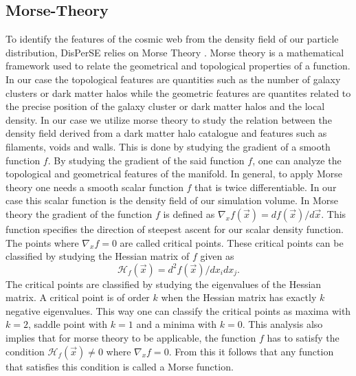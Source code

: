 \subsection{Morse-Theory}
To identify the features of the cosmic web from the density field of our
particle distribution, DisPerSE relies on Morse Theory \cite{Morse}. Morse
theory is a mathematical framework used to relate the geometrical and
topological properties of a function. In our case the topological features are quantities such as the number of galaxy clusters or dark matter halos while the geometric features are quantites related to the precise position of the galaxy cluster or dark matter halos and the local density. In our case we utilize morse theory to
study the relation between the density field derived from a dark matter halo catalogue and features such as
filaments, voids and walls.
This is done by studying the gradient of a smooth function $f$. By studying the
gradient of the said function $f$, one can analyze the topological and geometrical features of
the manifold. In general, to apply Morse theory one needs a smooth scalar function $f$
that is twice differentiable. In our case this scalar function is the density
field of our simulation volume. In Morse theory the gradient of the function $f$
is defined as $\nabla_xf(\vec{x})=df(\vec{x})/d\vec{x}$. This function
specifies the direction of steepest ascent for our scalar density function. The
points where $\nabla_xf=0$ are called critical points. These critical
points can be classified by studying the Hessian matrix of $f$ given as
\begin{equation}
    \mathcal{H}_f(\vec{x})=d^2f(\vec{x})/dx_idx_j.
\end{equation}
The critical points are classified by studying the eigenvalues of the Hessian
matrix. A critical point is of order $k$ when the Hessian matrix has exactly $k$
negative eigenvalues. This way one can classify the critical points as maxima
with $k=2$, saddle point with $k=1$ and a minima with $k=0$. This analysis also
implies that for morse theory to be applicable, the function $f$ has to satisfy
the condition $\mathcal{H}_f(\vec{x})\neq 0$ where $\nabla_xf=0$. From this it
follows that any function that satisfies this condition is called a Morse
function.\\
 
